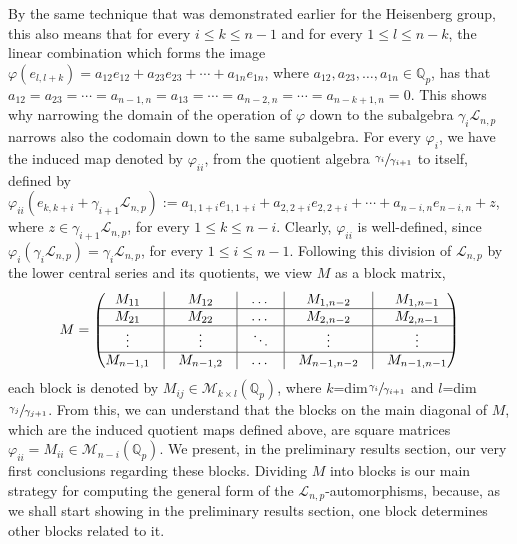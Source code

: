 \documentclass[12pt]{article}
\begin{document}
By the same technique that was demonstrated earlier for the Heisenberg group, this also means that for every $i\leq k\leq n-1$ and for every $1\leq l\leq n-k$, the linear combination which forms the image $\varphi(e_{l,l+k})=a_{12}e_{12}+a_{23}e_{23}+\cdots+a_{1n}e_{1n}$, where $a_{12},a_{23},\dots,a_{1n}\in\mathbb{Q}_p$, has that $a_{12}=a_{23}=\cdots=a_{n-1,n}=a_{13}=\cdots=a_{n-2,n}=\cdots=a_{n-k+1,n}=0$. This shows why narrowing the domain of the operation of $\varphi$ down to the subalgebra $\gamma_i\mathcal{L}_{n,p}$ narrows also the codomain down to the same subalgebra. For every $\varphi_i$, we have the induced map denoted by $\varphi_{ii}$, from the quotient algebra $\sfrac{\gamma_i}{\gamma_{i+1}}$ to itself, defined by $\varphi_{ii}(e_{k,k+i}+\gamma_{i+1}\mathcal{L}_{n,p}):=a_{1,1+i}e_{1,1+i}+a_{2,2+i}e_{2,2+i}+\cdots+a_{n-i,n}e_{n-i,n}+z$, where $z\in\gamma_{i+1}\mathcal{L}_{n,p}$, for every $1\leq k\leq n-i$. Clearly, $\varphi_{ii}$ is well-defined, since $\varphi_i(\gamma_i\mathcal{L}_{n,p})=\gamma_i\mathcal{L}_{n,p}$, for every $1\leq i\leq n-1$.
Following this division of $\mathcal{L}_{n,p}$ by the lower central series and its quotients, we view $M$ as a block matrix, $$M=\begin{pmatrix}
M_{11} & \vline & M_{12}&\vline & \dots& \vline & M_{1,n-2} & \vline&M_{1,n-1}\\
\hline
M_{21} & \vline & M_{22}&\vline & \dots &\vline & M_{2,n-2} &\vline& M_{2,n-1}\\
\hline
\vdots & \vline & \vdots&\vline & \ddots &\vline & \vdots &\vline& \vdots\\
\hline
M_{n-1,1} & \vline & M_{n-1,2}&\vline & \dots &\vline & M_{n-1,n-2} &\vline& M_{n-1,n-1}\\
\end{pmatrix}
$$
each block is denoted by $M_{ij}\in\mathcal{M}_{k\times l}(\mathbb{Q}_p)$, where $k$=dim$\sfrac{\gamma_i}{\gamma_{i+1}}$ and $l$=dim$\sfrac{\gamma_j}{\gamma_{j+1}}$. From this, we can understand that the blocks on the main diagonal of $M$, which are the induced quotient maps defined above, are square matrices $\varphi_{ii}=M_{ii}\in\mathcal{M}_{n-i}(\mathbb{Q}_p)$. We present, in the preliminary results section, our very first conclusions regarding these blocks. Dividing $M$ into blocks is our main strategy for computing the general form of the $\mathcal{L}_{n,p}$-automorphisms, because, as we shall start showing in the preliminary results section, one block determines other blocks related to it.
\end{document}
